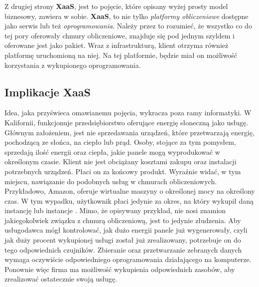 Z drugiej strony \textbf{XaaS}, jest to pojęcie, które
opisany wyżej prosty model biznesowy, zawiera w sobie. \textbf{XaaS}, to nie tylko \textit{platformy obliczeniowe} dostępne jako serwis lub też \textit{oprogramowania}.
Należy przez to rozumieć, że wszystko co do tej pory oferowały chmury obliczeniowe, znajduje się pod jednym szyldem i oferowane jest jako pakiet. 
Wraz z infrastrukturą, klient otrzyma również platformę uruchomioną na niej. Na tej platformie, będzie miał on możliwość korzystania z wykupionego oprogramowania.

\subsection{Implikacje XaaS}
Idea, jaka przyświeca omawianemu pojęcia, wykracza poza ramy informatyki. W Kalifornii, funkcjonuje
przedsiębiorstwo oferujące energię słoneczną jako usługę. Głównym założeniem, jest nie sprzedawania
urządzeń, które przetwarzają energię, pochodzącą ze słońca, na ciepło lub prąd. Osoby, stojące za tym pomysłem, sprzedają ilość energii oraz ciepła, jakie 
panele mogą wyprodukować w określonym czasie. Klient nie jest obciążany kosztami zakupu oraz instalacji
potrzebnych urządzeń. Płaci on za końcowy produkt. Wyraźnie widać, w tym miejscu, nawiązanie do 
podobnych usług w chmurach obliczeniowych. Przykładowo, Amazon, oferuje wirtualne maszyny o określonej mocy na określony czas. W tym wypadku, 
użytkownik płaci jedynie za okres, na który wykupił daną instancję lub instancje \cite{linkedin_anything_as_a_service}. Mimo, że opisywany przykład,
nie nosi znamion jakiegokolwiek związku z chmurą obliczeniową, jest to jedynie złudzenia. Aby usługodawca mógł kontrolować, jak dużo energii panele
już wygenerowały, czyli jak duży procent wykupionej usługi został już zrealizowany, potrzebuje on do tego odpowiednich czujników. Zbieranie oraz
przetwarzanie zebranych danych wymaga oczywiście odpowiedniego oprogramowania działającego na komputerze. Ponownie więc firma ma możliwość
wykupienia odpowiednich zasobów, aby zrealizować ostatecznie swoją usługę. 